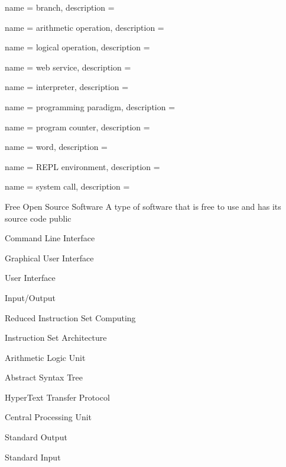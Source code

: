  {
  name = {branch},
  description = {}
}

 {
  name = {arithmetic operation},
  description = {}
}

 {
  name = {logical operation},
  description = {}
}

 {
  name = {web service},
  description = {}
}

 {
  name = {interpreter},
  description = {}
}

 {
  name = {programming paradigm},
  description = {}
}

 {
  name = {program counter},
  description = {}
}

 {
  name = {word},
  description = {}
}

 {
  name = {REPL environment},
  description = {}
}

 {
  name = {system call},
  description = {}
}


{Free Open Source Software}
{A type of software that is free to use and has its source code public}

{Command Line Interface}
{}

{Graphical User Interface}
{}

{User Interface}
{}


{Input/Output}
{}

{Reduced Instruction Set Computing}
{}

{Instruction Set Architecture}
{}

{Arithmetic Logic Unit}
{}

{Abstract Syntax Tree}
{}

{HyperText Transfer Protocol}
{}

{Central Processing Unit}
{}

{Standard Output}
{}

{Standard Input}
{}


